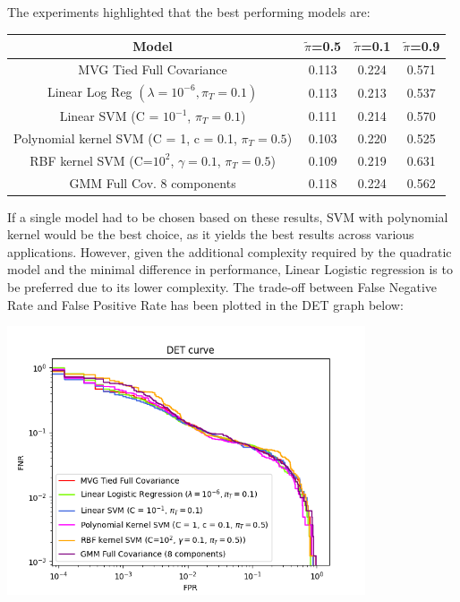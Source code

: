 \documentclass[12pt,a4paper]{article}
\begin{document}
The experiments highlighted that the best performing models are:
{\noindent
\begin{tabular}{@{}cccc@{}}
    Model                                                  & \(\tilde{\pi}\)=0.5 & \(\tilde{\pi}\)=0.1 & \(\tilde{\pi}\)=0.9 \\
    \hline
    MVG Tied Full Covariance                               & 0.113               & 0.224               & 0.571               \\
    Linear Log Reg $(\lambda = 10^{-6}, \pi_T = 0.1)$      & 0.113               & 0.213               & 0.537               \\
    Linear SVM (C = $10^{-1}$, $\pi_T = 0.1$)              & 0.111               & 0.214               & 0.570               \\
    Polynomial kernel SVM (C = 1, c = 0.1, $\pi_T = 0.5$)  & 0.103               & 0.220               & 0.525               \\
    RBF kernel SVM (C=$10^2$, $\gamma=0.1$, $\pi_T = 0.5$) & 0.109               & 0.219               & 0.631               \\
    GMM Full Cov. 8 components                             & 0.118               & 0.224               & 0.562               \\
\end{tabular}
}

If a single model had to be chosen based on these results, SVM with polynomial kernel would be the best choice, as it yields the best results across various applications.
However, given the additional complexity required by the quadratic model and the minimal difference in performance, Linear Logistic regression is to be preferred due to its lower complexity.
The trade-off between False Negative Rate and False Positive Rate has been plotted in the DET graph below:

\begin{center}
    \includegraphics[width=300pt]{img/evaluation_plots/DET_plot_best_models.png}
\end{center}
\end{document}
